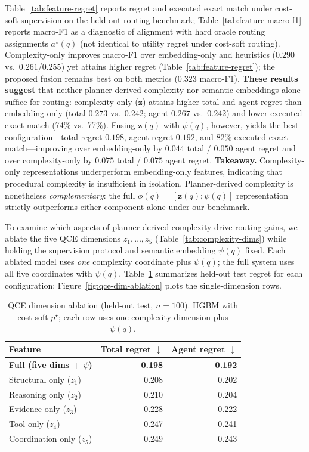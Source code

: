 Table~\ref{tab:feature-regret} reports regret and executed exact match under cost-soft
supervision on the held-out routing benchmark; Table~\ref{tab:feature-macro-f1} reports
macro-F1 as a diagnostic of alignment with hard oracle routing assignments $a^\star(q)$
(not identical to utility regret under cost-soft routing).
Complexity-only improves macro-F1 over embedding-only and heuristics ($0.290$ vs.\
$0.261$/$0.255$) yet attains higher regret (Table~\ref{tab:feature-regret}); the proposed
fusion remains best on both metrics ($0.323$ macro-F1).
\textbf{These results suggest} that neither planner-derived complexity nor semantic embeddings
alone suffice for routing: complexity-only ($\mathbf{z}$) attains higher total and agent regret
than embedding-only (total $0.273$ vs.\ $0.242$; agent $0.267$ vs.\ $0.242$) and lower
executed exact match (74\% vs.\ 77\%).
Fusing $\mathbf{z}(q)$ with $\psi(q)$, however, yields the best configuration---total regret
$0.198$, agent regret $0.192$, and 82\% executed exact match---improving over embedding-only
by $0.044$ total / $0.050$ agent regret and over complexity-only by $0.075$ total /
$0.075$ agent regret.
\textbf{Takeaway.}
Complexity-only representations underperform embedding-only features, indicating that procedural
complexity is insufficient in isolation.
Planner-derived complexity is nonetheless \emph{complementary}: the full
$\phi(q)=[\mathbf{z}(q);\psi(q)]$ representation strictly outperforms either component alone
under our benchmark.

To examine which aspects of planner-derived complexity drive routing gains, we ablate the
five QCE dimensions $z_1,\ldots,z_5$ (Table~\ref{tab:complexity-dims}) while holding the
supervision protocol and semantic embedding $\psi(q)$ fixed.
Each ablated model uses \emph{one} complexity coordinate plus $\psi(q)$; the full system uses
all five coordinates with $\psi(q)$.
Table~\ref{tab:qce-dim-ablation} summarizes held-out test regret for each configuration;
Figure~\ref{fig:qce-dim-ablation} plots the single-dimension rows.

\begin{table}[t]
  \centering
  \footnotesize
  \caption{QCE dimension ablation (held-out test, $n{=}100$).
    HGBM with cost-soft $p^\star$; each row uses one complexity dimension plus $\psi(q)$.}
  \label{tab:qce-dim-ablation}
  \begin{tabular}{@{}lrr@{}}
    \toprule
    Feature & Total regret $\downarrow$ & Agent regret $\downarrow$ \\
    \midrule
    \textbf{Full (five dims + $\psi$)} & \textbf{0.198} & \textbf{0.192} \\
    Structural only ($z_1$) & 0.208 & 0.202 \\
    Reasoning only ($z_2$) & 0.210 & 0.204 \\
    Evidence only ($z_3$) & 0.228 & 0.222 \\
    Tool only ($z_4$) & 0.247 & 0.241 \\
    Coordination only ($z_5$) & 0.249 & 0.243 \\
    \bottomrule
  \end{tabular}
\end{table}

